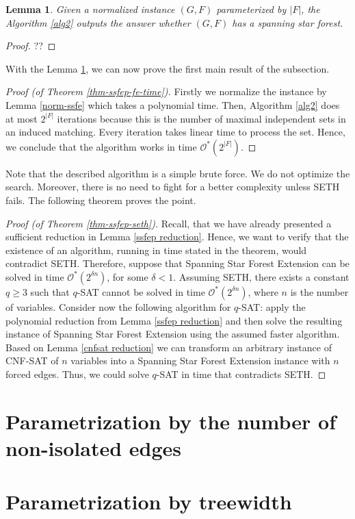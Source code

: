 \documentclass[en]{pracamgr}
\newtheorem{lemma}{Lemma}
\newcommand{\ssfep}{{\sc Spanning Star Forest Extension}}
\newcommand{\cnfsat}{{\sc CNF-SAT}}
\begin{document}
\begin{lemma}\label{alg2-correctness}
	Given a normalized instance $(G,F)$ parameterized by $|F|$, the Algorithm \ref{alg2} outputs the answer whether $(G,F)$ has a spanning star forest.
\end{lemma}

\begin{proof}
	??
\end{proof}

With the Lemma \ref{alg2-correctness}, we can now prove the first main result of the subsection.

\begin{proof}[Proof (of Theorem \ref{thm-ssfep-fe-time})]
	Firstly we normalize the instance by Lemma \ref{norm-ssfe} which takes a polynomial time. Then, Algorithm \ref{alg2} does at most $2^{|F|}$ iterations because this is the number of maximal independent sets in an induced matching. Every iteration takes linear time to process the set. Hence, we conclude that the algorithm works in time $\mathcal{O}^*(2^{|F|})$.
\end{proof}

Note that the described algorithm is a simple brute force. We do not optimize the search. Moreover, there is no need to fight for a better complexity unless SETH fails. The following theorem proves the point.

\begin{proof}[Proof (of Theorem \ref{thm-ssfep-seth})]
	Recall, that we have already presented a sufficient reduction in Lemma \ref{ssfep reduction}. Hence, we want to verify that the existence of an algorithm, running in time stated in the theorem, would contradict SETH. Therefore, suppose that \ssfep{} can be solved in time $\mathcal{O}^*(2^{\delta n})$, for some $\delta < 1$. Assuming SETH, there exists a constant $q \geq 3$ such that $q${\sc -SAT} cannot be solved in time $\mathcal{O}^*(2^{\delta n})$, where $n$ is the number of variables. Consider now the following algorithm for $q${\sc -SAT}: apply the polynomial reduction from Lemma \ref{ssfep reduction} and then solve the resulting instance of \ssfep{} using the assumed faster algorithm. Based on Lemma \ref{cnfsat reduction} we can transform an arbitrary instance of \cnfsat{} of $n$ variables into a \ssfep{} instance with $n$ forced edges. Thus, we could solve $q${\sc -SAT} in time that contradicts SETH.
\end{proof}

\section{Parametrization by the number of non-isolated edges}

\section{Parametrization by treewidth}

\begin{thebibliography}{99}


\end{thebibliography}
\end{document}
